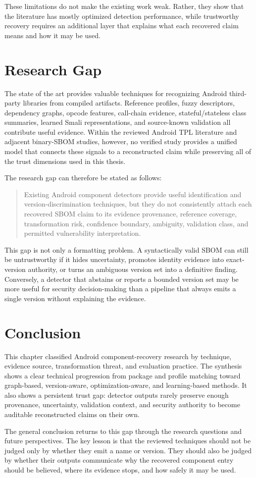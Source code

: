 These limitations do not make the existing work weak. Rather, they show that
the literature has mostly optimized detection performance, while trustworthy
\SBOM recovery requires an additional layer that explains what each recovered
claim means and how it may be used.

\section{Research Gap}

The state of the art provides valuable techniques for recognizing Android
third-party libraries from compiled artifacts. Reference profiles, fuzzy
descriptors, dependency graphs, opcode features, call-chain evidence,
stateful/stateless class summaries, learned Smali representations, and
source-known validation all contribute useful evidence. Within the reviewed
Android TPL literature and adjacent binary-SBOM studies, however, no verified
study provides a unified model that connects these signals to a reconstructed
\SBOM claim while preserving all of the trust dimensions used in this thesis.

The research gap can therefore be stated as follows:

\begin{quote}
Existing Android component detectors provide useful identification and
version-discrimination techniques, but they do not consistently attach each
recovered SBOM claim to its evidence provenance, reference coverage,
transformation risk, confidence boundary, ambiguity, validation class, and
permitted vulnerability interpretation.
\end{quote}

This gap is not only a formatting problem. A syntactically valid SBOM can
still be untrustworthy if it hides uncertainty, promotes identity evidence
into exact-version authority, or turns an ambiguous version set into a
definitive \CVE finding. Conversely, a detector that abstains or reports a
bounded version set may be more useful for security decision-making than a
pipeline that always emits a single version without explaining the evidence.

\section{Conclusion}

This chapter classified Android component-recovery research by technique,
evidence source, transformation threat, and evaluation practice. The synthesis
shows a clear technical progression from package and profile matching toward
graph-based, version-aware, optimization-aware, and learning-based methods.
It also shows a persistent trust gap: detector outputs rarely preserve enough
provenance, uncertainty, validation context, and security authority to become
auditable reconstructed \SBOM claims on their own.

The general conclusion returns to this gap through the research questions and
future perspectives. The key lesson is that the reviewed techniques should not
be judged only by whether they emit a name or version. They should also be
judged by whether their outputs communicate why the recovered component entry
should be believed, where its evidence stops, and how safely it may be used.
